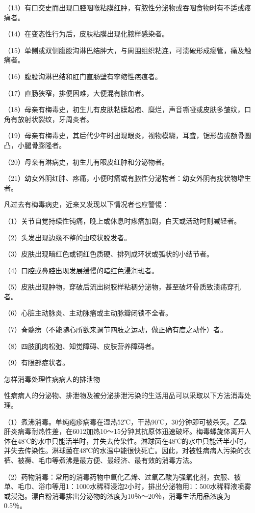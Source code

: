 \documentclass[12pt,UTF8]{ctexbook}
\begin{document}
（13）有口交史而出现口腔咽喉粘膜红肿，有脓性分泌物或吞咽食物时有不适或疼痛者。

（14）在变态性行为后，皮肤粘膜出现化脓样感染者。

（15）单侧或双侧腹股沟淋巴结肿大，与周围组织粘连，可溃破形成瘘管，痛及触痛者。

（16）腹股沟淋巴结和肛门直肠壁有挛缩性疤痕者。

（17）直肠狭窄，排便困难，大便混有脓血者。

（18）母亲有梅毒史，初生儿有皮肤粘膜起疱、糜烂，声音嘶哑或皮肤多皱纹，口角有放射状裂纹，牙周炎者。

（19）母亲有梅毒史，其后代少年时出现眼炎，视物模糊，耳聋，锯形齿或额骨圆凸，小腿骨膨隆者。

（20）母亲有淋病史，初生儿有眼皮红肿和分泌物者。

（21）幼女外阴红肿、疼痛，小便时痛或有脓性分泌物者：幼女外阴有疣状物增生者。

凡过去有梅毒病史，近来又发现以下情况者也应警惕：

（1）关节自觉持续性钝痛，晚上或休息时疼痛加剧，白天或活动时则减轻者。

（2）头发出现边缘不整的虫咬状脱发者。

（3）皮肤出现暗红色或铜红色质硬、排列成环状或弧状的小结节者。

（4）口腔或鼻腔出现发展缓慢的暗红色浸润斑者。

（5）皮肤出现肿物，穿破后流出树胶样粘稠分泌物，甚至破坏骨质致溃疡穿孔者。

（6）心脏主动脉炎、主动脉瘤或主动脉瓣闭锁不全者。

（7）脊髓痨（不能随心所欲来调节四肢之运动，做正确有度之动作）者。

（8）四肢肌肉松弛、知觉障碍、皮肤营养障碍者。

（9）有限部症状者。





怎样消毒处理性病病人的排泄物


性病病人的分泌物、排泄物及被分泌排泄污染的生活用品可以采取以下方法消毒处理。

（1）煮沸消毒。单纯疱疹病毒在湿热52℃，干热90℃，30分钟即可被杀灭。乙型肝炎病毒耐热性差，在6012加热10～15分钟其抗原体迅速破坏。梅毒螺旋体离开人体在48℃的水中只能活半时，并失去传染性。淋球菌在48℃的水中只能活半小时，并失去传染性。淋球菌在48℃的水温中能很快死亡。因此，对被性病病人污染的衣裤、被褥、毛巾等煮沸是最方便、最经济、最有效的消毒方法。

（2）药物消毒：常用的消毒药物中氧化乙烯、过氧乙酸为强氧化剂，衣服、被单、毛巾、浴巾等用1：1000水稀释浸泡2小时，排出分泌物用1：500水稀释液喷雾或浸泡。漂白粉消毒排出分泌物的浓度为10％～20％，消毒生活用品浓度为0.5％。
\end{document}
